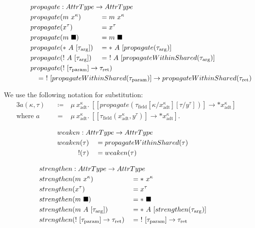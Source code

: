 \begin{alignat*}{3}
  propagate &: \mathrlap{AttrType \to AttrType} \\
  propagate&(m\ x^\kappa) &&= m\ x^\kappa \\
  propagate&(x^\tau) &&= x^\tau \\
  propagate&(m\ \blacksquare) &&= m\ \blacksquare \\
  propagate&(*\ A\ [\tau_\text{arg}]) &&= *\ A\ [propagate(\tau_\text{arg})] \\
  propagate&(!\ A\ [\tau_\text{arg}]) &&= \ !\ A\ [propagateWithinShared(\tau_\text{arg})] \\
  propagate&\mathrlap{(!\ [\tau_\text{param}] \to \tau_\text{ret})} \\
  \mathclap{\hspace{25em}= \ !\ [propagateWithinShared(\tau_\text{param})] \to propagateWithinShared(\tau_\text{ret})}
\end{alignat*}

We use the following notation for substitution:
\begin{alignat*}{3}
  a(\kappa, \tau)\ &&\coloneqq&\ \mu\ x^\kappa_\text{adt}.\ [[propagate(\tau_\text{field}[\kappa/x^\kappa_\text{adt}][\tau/y^\tau])] \to *x^\kappa_\text{adt}] \\
  \text{where } a &&=&\ \mu\ x^\kappa_\text{adt}.\ [[\tau_\text{field}(x^\kappa_\text{adt}, y^\tau)] \to *x^\kappa_\text{adt}].
\end{alignat*}

\begin{alignat*}{3}
  weaken &: \mathrlap{AttrType \to AttrType} \\
  weaken&(\tau) &&= propagateWithinShared(\tau) \\
  !&(\tau) &&= weaken(\tau)
\end{alignat*}

\begin{alignat*}{3}
  strengthen &: \mathrlap{AttrType \to AttrType} \\
  strengthen&(m\ x^\kappa) &&= *\ x^\kappa \\
  strengthen&(x^\tau) &&= x^\tau \\
  strengthen&(m\ \blacksquare) &&= *\ \blacksquare \\
  strengthen&(m\ A\ [\tau_\text{arg}]) &&= *\ A\ [strengthen(\tau_\text{arg})] \\
  strengthen&(!\ [\tau_\text{param}] \to \tau_\text{ret}) &&=\ !\ [\tau_\text{param}] \to \tau_\text{ret} \\
\end{alignat*}

